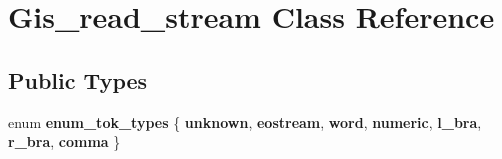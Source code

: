 \hypertarget{classGis__read__stream}{}\section{Gis\+\_\+read\+\_\+stream Class Reference}
\label{classGis__read__stream}
\subsection*{Public Types}
\begin{DoxyCompactItemize}
\item 
\mbox{\label{classGis__read__stream_a0da4f1dae46a3d0a6a9028ddafb5c997}} 
enum {\bfseries enum\+\_\+tok\+\_\+types} \{ \newline
{\bfseries unknown}, 
{\bfseries eostream}, 
{\bfseries word}, 
{\bfseries numeric}, 
\newline
{\bfseries l\+\_\+bra}, 
{\bfseries r\+\_\+bra}, 
{\bfseries comma}
 \}
\end{DoxyCompactItemize}
